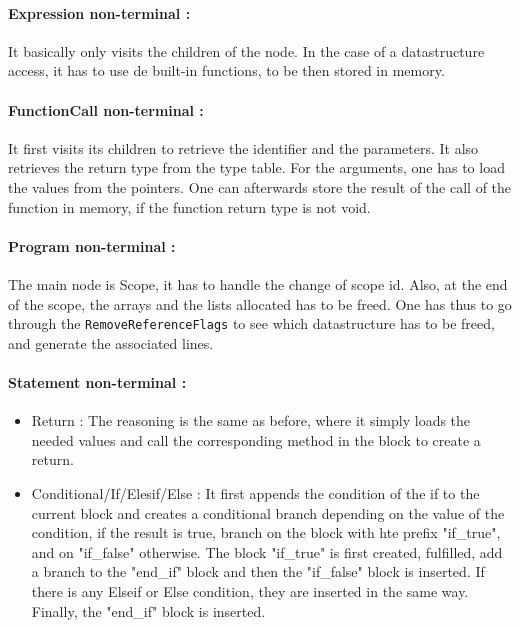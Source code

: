 \documentclass[a4paper,11pt]{article}
\begin{document}
\paragraph{Expression non-terminal :} It basically only visits the children of the node. In the case of a datastructure access, it has to use de built-in functions, to be then stored in memory.

\paragraph{FunctionCall non-terminal :} It first visits its children to retrieve the identifier and the parameters. It also retrieves the return type from the type table. For the arguments, one has to load the values from the pointers. One can afterwards store the result of the call of the function in memory, if the function return type is not void.

\paragraph{Program non-terminal :} The main node is Scope, it has to handle the change of scope id. Also, at the end of the scope, the arrays and the lists allocated has to be freed. One has thus to go through the \texttt{RemoveReferenceFlags} to see which datastructure has to be freed, and generate the associated lines.

\paragraph{Statement non-terminal :} 

\begin{itemize}
	\item Return : The reasoning is the same as before, where it simply loads the needed values and call the corresponding method in the block to create a return.
	\item Conditional/If/Elesif/Else : It first appends the condition of the if to the current block and creates a conditional branch depending on the value of the condition, if the result is true, branch on the block with hte prefix "if\_true", and on "if\_false" otherwise. The block "if\_true" is first created, fulfilled, add a branch to the "end\_if" block and then the "if\_false" block is inserted. If there is any Elseif or Else condition, they are inserted in the same way. Finally, the "end\_if" block is inserted.
\end{itemize}
\end{document}
